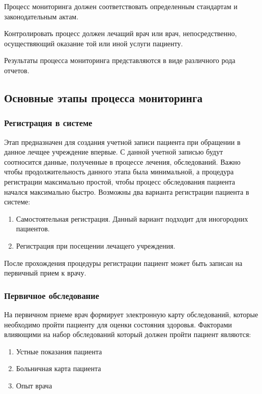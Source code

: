 Процесс мониторинга должен соответствовать определенным стандартам и законодательным актам.

Контролировать процесс должен лечащий врач или врач, непосредственно, осуществяющий оказание той или иной услуги пациенту.

Результаты процесса мониторинга представляются в виде различного рода отчетов.

\subsection{Основные этапы процесса мониторинга}

\subsubsection{Регистрация в системе}

Этап предназначен для создания учетной записи пациента при обращении в данное
лечщее учреждение впервые. С данной учетной записью будут соотносится данные,
полученные в процессе лечения, обследований. Важно чтобы продолжительность
данного этапа была минимальной, а процедура регистрации максимально простой,
чтобы процесс обследования пациента начался максимально быстро.
Возможны два варианта регистрации пациента в системе:

\begin{enumerate}
  \item Самостоятельная регистрация. Данный вариант подходит для иногородних
  пациентов.
  \item Регистрация при посещении лечащего учреждения.
\end{enumerate}

После прохождения процедуры регистрации пациент может быть записан на первичный
прием к врачу.

\subsubsection{Первичное обследование}

На первичном приеме врач формирует электронную карту обследований, которые
необходимо пройти пациенту для оценки состояния здоровья. Факторами влияющими на
набор обследований который должен пройти пациент являются:
\begin{enumerate}
  \item Устные показания пациента
  \item Больничная карта пациента
  \item Опыт врача   
\end{enumerate}

